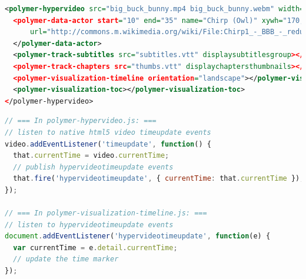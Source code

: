\documentclass[runningheads,a4paper]{llncs}
\begin{document}
\begin{lstlisting}[caption={Web Components mark-up for the hypervideo in \autoref{fig:screenshot}, including subtitles, chapters, timeline, and table of contents widgets; the actor annotation contains a spatial fragment
(\texttt{xywh})~\cite{troncy2012mediafragments} and a~hyperlink (\texttt{url})
  to Wikimedia Commons},
  label=listing:polymer, language=xml,
  float=b!, stringstyle=\color{gray},morekeywords={polymer,hypervideo,track,subtitles,chapters,toc,timeline,visualization,data,actor,src,end,start,name,url,width,height,muted,displaysubtitlesgroup,orientation,displaychaptersthumbnails,xywh}]
<polymer-hypervideo src="big_buck_bunny.mp4 big_buck_bunny.webm" width="400" height="225" muted>
  <polymer-data-actor start="10" end="35" name="Chirp (Owl)" xywh="170,20,70,80" 
      url="http://commons.m.wikimedia.org/wiki/File:Chirp1_-_BBB_-_reduced_snapshot.png">
  </polymer-data-actor>
  <polymer-track-subtitles src="subtitles.vtt" displaysubtitlesgroup></polymer-track-subtitles>
  <polymer-track-chapters src="thumbs.vtt" displaychaptersthumbnails></polymer-track-chapters>
  <polymer-visualization-timeline orientation="landscape"></polymer-visualization-timeline>
  <polymer-visualization-toc></polymer-visualization-toc>
</polymer-hypervideo>
\end{lstlisting}

\begin{lstlisting}[caption={Native JavaScript event communication
  between Web Components},
  label=listing:events, language=JavaScript,
  float=b!, stringstyle=\color{gray},morekeywords={addEventListener,document}]
// === In polymer-hypervideo.js: ===
// listen to native html5 video timeupdate events
video.addEventListener('timeupdate', function() {
  that.currentTime = video.currentTime;
  // publish hypervideotimeupdate events
  that.fire('hypervideotimeupdate', { currentTime: that.currentTime });
});

// === In polymer-visualization-timeline.js: ===
// listen to hypervideotimeupdate events
document.addEventListener('hypervideotimeupdate', function(e) {
  var currentTime = e.detail.currentTime;
  // update the time marker
});
\end{lstlisting}
\end{document}
